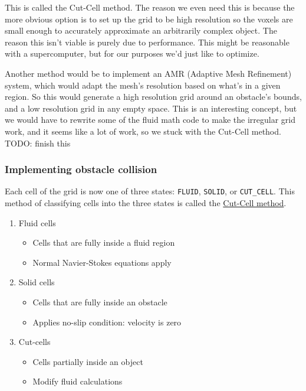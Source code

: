 \documentclass[a4paper,12pt,titlepage]{article}
\begin{document}
This is called the Cut-Cell method. The reason we even need this is because
the more obvious option is to set up the grid to be high resolution so the voxels
are small enough to accurately approximate an arbitrarily complex object.
The reason this isn't viable is purely due to performance. This might be reasonable
with a supercomputer, but for our purposes we'd just like to optimize.

Another method would be to implement an AMR (Adaptive Mesh Refinement) system,
which would adapt the mesh's resolution based on what's in a given region. So this would
generate a high resolution grid around an obstacle's bounds, and a low resolution
grid in any empty space. This is an interesting concept, but we would have to
rewrite some of the fluid math code to make the irregular grid work, and it seems
like a lot of work, so we stuck with the Cut-Cell method. TODO: finish this

\subsubsection{Implementing obstacle collision}
Each cell of the grid is now one of three states: \lstinline{FLUID},
\lstinline{SOLID}, or \lstinline{CUT_CELL}. This method of classifying cells
into the three states is called the \href{https://www.sciencedirect.com/science/article/pii/S0307904X00000056}{Cut-Cell method}.
\begin{enumerate}
	\item{Fluid cells}
		\begin{itemize}
			\item{Cells that are fully inside a fluid region}
			\item{Normal Navier-Stokes equations apply}
		\end{itemize}
	\item{Solid cells}
		\begin{itemize}
			\item{Cells that are fully inside an obstacle}
			\item{Applies no-slip condition: velocity is zero}
		\end{itemize}
	\item{Cut-cells}
		\begin{itemize}
			\item{Cells partially inside an object}
			\item{Modify fluid calculations}
		\end{itemize}
\end{enumerate}
\end{document}

